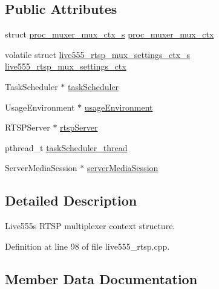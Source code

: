 \subsection*{Public Attributes}
\begin{DoxyCompactItemize}
\item 
struct \hyperlink{structproc__muxer__mux__ctx__s}{proc\+\_\+muxer\+\_\+mux\+\_\+ctx\+\_\+s} \hyperlink{structlive555__rtsp__mux__ctx__s_ab2d3e4e814802a6f61b65465bb222a7c}{proc\+\_\+muxer\+\_\+mux\+\_\+ctx}
\item 
volatile struct \hyperlink{structlive555__rtsp__mux__settings__ctx__s}{live555\+\_\+rtsp\+\_\+mux\+\_\+settings\+\_\+ctx\+\_\+s} \hyperlink{structlive555__rtsp__mux__ctx__s_a71c6838180308bfa9bf5e3c3caca682f}{live555\+\_\+rtsp\+\_\+mux\+\_\+settings\+\_\+ctx}
\item 
Task\+Scheduler $\ast$ \hyperlink{structlive555__rtsp__mux__ctx__s_a9cee4d2b64755aad6fd9d98fddcf0c30}{task\+Scheduler}
\item 
Usage\+Environment $\ast$ \hyperlink{structlive555__rtsp__mux__ctx__s_aeb1c6f315ab2d2d6a7c10f014a95251a}{usage\+Environment}
\item 
R\+T\+S\+P\+Server $\ast$ \hyperlink{structlive555__rtsp__mux__ctx__s_a3c89cf1bf900f3846aee1e8a4508043d}{rtsp\+Server}
\item 
pthread\+\_\+t \hyperlink{structlive555__rtsp__mux__ctx__s_af825f93bf9fcae44c41ace5af235c8de}{task\+Scheduler\+\_\+thread}
\item 
Server\+Media\+Session $\ast$ \hyperlink{structlive555__rtsp__mux__ctx__s_acd9455b0d78bac504d4de35d55729e02}{server\+Media\+Session}
\end{DoxyCompactItemize}


\subsection{Detailed Description}
Live555\textquotesingle{}s R\+T\+SP multiplexer context structure. 

Definition at line 98 of file live555\+\_\+rtsp.\+cpp.



\subsection{Member Data Documentation}
